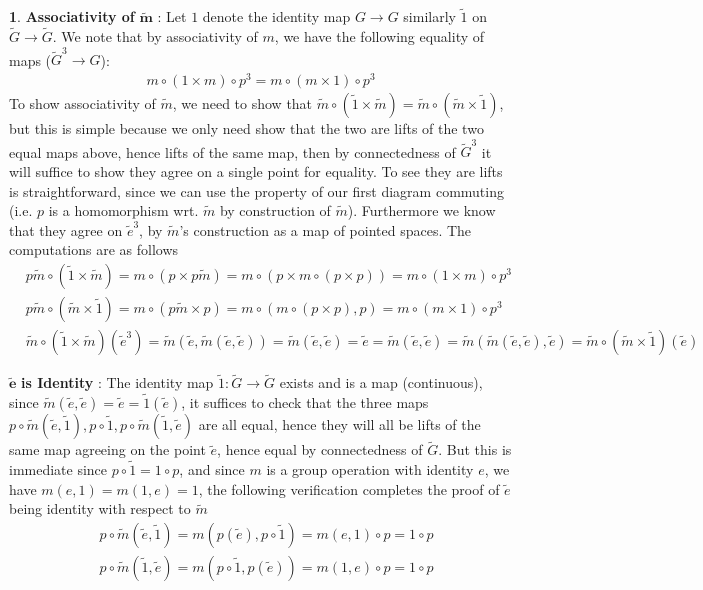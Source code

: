 \documentclass[10.5pt]{article}
\theoremstyle{definition}
\newtheorem{pb}{}
\begin{document}
\begin{pb}
        \textbf{Associativity of} \(\mathbf{\tilde{m}}\) : Let \(1\) denote the identity map \(G \to G\) similarly \(\tilde{1}\) on \(\tilde{G} \to \tilde{G}\). We note that by associativity of \(m\), we have the following equality of maps (\(\tilde{G}^3 \to G\)):
        \begin{align*}
            m \circ (1 \times m) \circ p^3 = m \circ (m \times 1) \circ p^3
        \end{align*}
        To show associativity of \(\tilde{m}\), we need to show that \(\tilde{m} \circ (\tilde{1} \times \tilde{m}) = \tilde{m} \circ (\tilde{m} \times \tilde{1})\), but this is simple because we only need show that the two are lifts of the two equal maps above, hence lifts of the same map, then by connectedness of \(\tilde{G}^3\) it will suffice to show they agree on a single point for equality. To see they are lifts is straightforward, since we can use the property of our first diagram commuting (i.e. \(p\) is a homomorphism wrt. \(\tilde{m}\) by construction of \(\tilde{m}\)). Furthermore we know that they agree on \(\tilde{e}^3\), by \(\tilde{m}\)'s construction as a map of pointed spaces. The computations are as follows
        \begin{align*}
            &p\tilde{m} \circ (\tilde{1} \times \tilde{m}) = m \circ (p \times p\tilde{m})
            = m \circ (p \times m\circ(p \times p)) = m \circ (1 \times m) \circ p^3 \\
            &p\tilde{m} \circ (\tilde{m} \times \tilde{1}) = m \circ(p\tilde{m}\times p) = m \circ (m \circ (p \times p),p) = m \circ (m \times 1) \circ p^3\\
            &\tilde{m} \circ (\tilde{1} \times \tilde{m})(\tilde{e}^3) = \tilde{m}(\tilde{e},\tilde{m}(\tilde{e},\tilde{e})) = \tilde{m}(\tilde{e},\tilde{e}) = \tilde{e} = \tilde{m}(\tilde{e},\tilde{e}) = \tilde{m}(\tilde{m}(\tilde{e},\tilde{e}),\tilde{e}) = \tilde{m}\circ(\tilde{m} \times \tilde{1})(\tilde{e})
        \end{align*}
        
        \(\mathbf{\tilde{e}}\) \textbf{is Identity} : The identity map \(\tilde{1}: \tilde{G} \to \tilde{G}\) exists and is a map (continuous), since \(\tilde{m}(\tilde{e},\tilde{e}) = \tilde{e} = \tilde{1}(\tilde{e})\), it suffices to check that the three maps \(p\circ\tilde{m}(\tilde{e},\tilde{1}), p\circ\tilde{1}, p\circ\tilde{m}(\tilde{1},\tilde{e})\) are all equal, hence they will all be lifts of the same map agreeing on the point \(\tilde{e}\), hence equal by connectedness of \(\tilde{G}\). But this is immediate since \(p\circ\tilde{1} = 1\circ p\), and since \(m\) is a group operation with identity \(e\), we have \(m(e,1) = m(1,e) = 1\), the following verification completes the proof of \(\tilde{e}\) being identity with respect to \(\tilde{m}\)
        \begin{align*}
            &p\circ\tilde{m}(\tilde{e},\tilde{1}) = m(p(\tilde{e}),p\circ \tilde{1}) = m(e,1)\circ p = 1 \circ p \\
            &p\circ\tilde{m}(\tilde{1},\tilde{e}) = m(p\circ \tilde{1},p(\tilde{e})) = m(1,e)\circ p = 1 \circ p
        \end{align*}


\end{pb}
\end{document}
